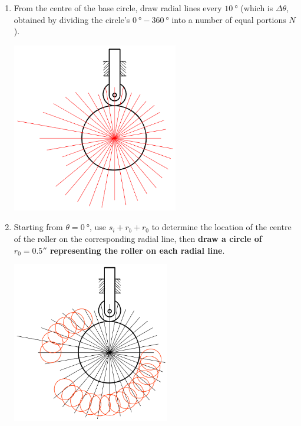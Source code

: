 \documentclass[11pt]{article}
\begin{document}
\begin{enumerate}
\item From the centre of the base circle, draw radial lines every \(\qty{10}{\degree}\) (which is \(\Delta \theta\), obtained by dividing the circle's \(\qty{0}{\degree} - \qty{360}{\degree}\) into a number of equal portions \(N\)).
\begin{center}
\includegraphics[height=20em]{./images/graphical-construction-of-cam-radial-lines.png}
\end{center}

\item Starting from \(\theta = \qty{0}{\degree}\), use \(s_i + r_b + r_0\) to determine the location of the centre of the roller on the corresponding radial line, then \textbf{draw a circle of \(r_0 = 0.5''\) representing the roller on each radial line}.
\begin{center}
\includegraphics[height=19em]{./images/graphical-construction-of-cam-roller-representation.png}
\end{center}


\end{enumerate}
\end{document}
